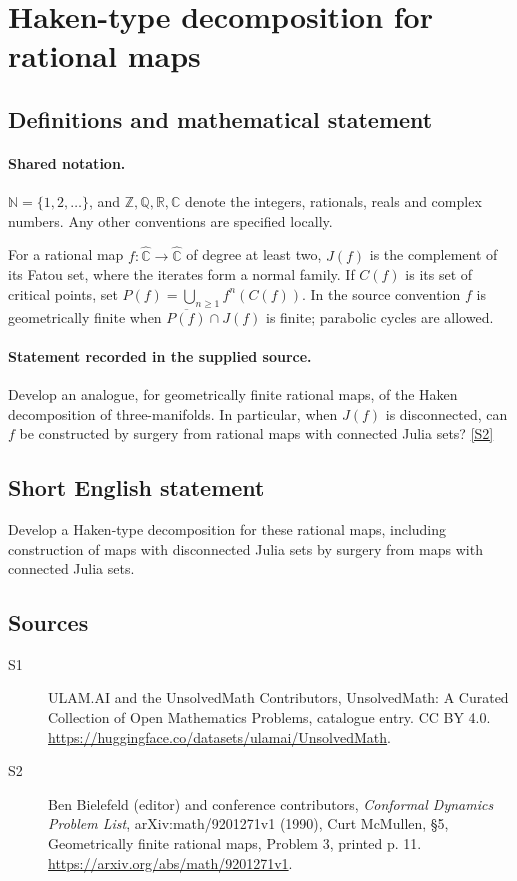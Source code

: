 \documentclass[11pt]{article}
\newcommand{\sref}[2]{\hyperlink{source:#1:#2}{[S#2]}}
\begin{document}
\section{Haken-type decomposition for rational maps}\label{statement}

\subsection{Definitions and mathematical statement}

\paragraph{Shared notation.}$\mathbb N=\{1,2,\ldots\}$, and $\mathbb Z,\mathbb Q,\mathbb R,\mathbb C$ denote the integers, rationals, reals and complex numbers. Any other conventions are specified locally.


For a rational map $f:\widehat{\mathbb C}\to\widehat{\mathbb C}$ of degree at least two, $J(f)$ is the complement of its Fatou set, where the iterates form a normal family. If $C(f)$ is its set of critical points, set $P(f)=\bigcup_{n\geq1}f^n(C(f))$. In the source convention $f$ is geometrically finite when $\overline{P(f)}\cap J(f)$ is finite; parabolic cycles are allowed.
\paragraph{Statement recorded in the supplied source.}
Develop an analogue, for geometrically finite rational maps, of the Haken decomposition of three-manifolds. In particular, when $J(f)$ is disconnected, can $f$ be constructed by surgery from rational maps with connected Julia sets? \sref{statement}{2}
\subsection{Short English statement}
Develop a Haken-type decomposition for these rational maps, including construction of maps with disconnected Julia sets by surgery from maps with connected Julia sets.
\subsection{Sources}
\begin{description}
\item[\hypertarget{source:statement:1}{S1}] ULAM.AI and the UnsolvedMath Contributors, UnsolvedMath: A Curated Collection of Open Mathematics Problems, catalogue entry. CC BY 4.0. \url{https://huggingface.co/datasets/ulamai/UnsolvedMath}.
\item[\hypertarget{source:statement:2}{S2}] Ben Bielefeld (editor) and conference contributors, \emph{Conformal Dynamics Problem List}, arXiv:math/9201271v1 (1990), Curt McMullen, \S5, Geometrically finite rational maps, Problem 3, printed p. 11. \url{https://arxiv.org/abs/math/9201271v1}.
\end{description}
\label{end:statement}
\end{document}
